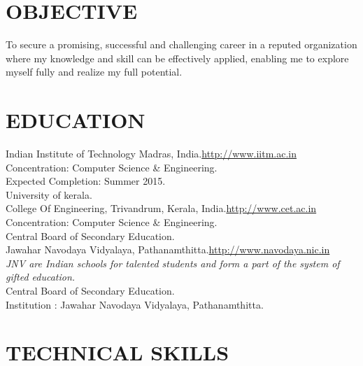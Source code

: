 \documentclass[11pt, a4paper, sans]{moderncv}
\begin{document}
\maketitle

\section{OBJECTIVE}
To secure a promising, successful and challenging career in a reputed organization where my knowledge and skill can be effectively applied, enabling me to explore myself fully and realize my full potential.\\


\section{EDUCATION}
{
Indian Institute of Technology Madras, India.\hfill \url{http://www.iitm.ac.in}\\
Concentration: Computer Science \& Engineering.\\
Expected Completion: Summer 2015.\\
}
{
University of kerala.\\
College Of Engineering, Trivandrum, Kerala, India.\hfill\url{http://www.cet.ac.in}\\
Concentration: Computer Science \& Engineering.\\
}
{
Central Board of Secondary Education.\\
Jawahar Navodaya Vidyalaya, Pathanamthitta.\hfill \url{http://www.navodaya.nic.in}\\
\textit{JNV are Indian schools for talented students and form a part of the system of gifted education.}\\
}
{
Central Board of Secondary Education.\\
Institution : Jawahar Navodaya Vidyalaya, Pathanamthitta. \\
}

\section{TECHNICAL SKILLS}
\end{document}
